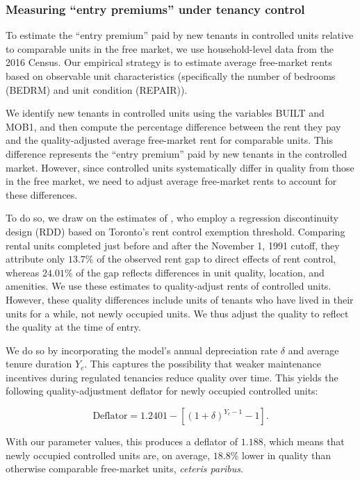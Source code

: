 \subsubsection{Measuring ``entry premiums'' under tenancy control}\label{section:appendix_measuring_premium}

To estimate the ``entry premium'' paid by new tenants in controlled units relative to comparable units in the free market, we use household-level data from the 2016 Census. Our empirical strategy is to estimate average free-market rents based on observable unit characteristics (specifically the number of bedrooms (BEDRM) and unit condition (REPAIR)).

We identify new tenants in controlled units using the variables BUILT and MOB1, and then compute the percentage difference between the rent they pay and the quality-adjusted average free-market rent for comparable units. This difference represents the ``entry premium'' paid by new tenants in the controlled market. However, since controlled units systematically differ in quality from those in the free market, we need to adjust average free-market rents to account for these differences.

To do so, we draw on the estimates of \citet{zhang-gou}, who employ a regression discontinuity design (RDD) based on Toronto’s rent control exemption threshold. Comparing rental units completed just before and after the November 1, 1991 cutoff, they attribute only $13.7\%$ of the observed rent gap to direct effects of rent control, whereas $24.01\%$ of the gap reflects differences in unit quality, location, and amenities. We use these estimates to quality-adjust rents of controlled units. However, these quality differences include units of tenants who have lived in their units for a while, not newly occupied units. We thus adjust the quality to reflect the quality at the time of entry.

We do so by incorporating the model’s annual depreciation rate $\delta$ and average tenure duration $Y_{c}$. This captures the possibility that weaker maintenance incentives during regulated tenancies reduce quality over time. This yields the following quality-adjustment deflator for newly occupied controlled units:

\begin{equation}\label{eq:deflator}
    \text{Deflator}=1.2401-[(1+\delta)^{Y_c-1}-1].
\end{equation}

\noindent With our parameter values, this produces a deflator of $1.188$, which means that newly occupied controlled units are, on average, $18.8\%$ lower in quality than otherwise comparable free-market units, \emph{ceteris paribus}.

